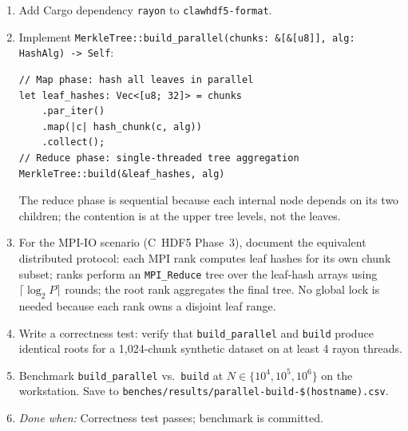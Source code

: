 \documentclass[11pt]{article}
\begin{document}
\begin{enumerate}[nosep]
  \item Add Cargo dependency \texttt{rayon} to \texttt{clawhdf5-format}.
  \item Implement \texttt{MerkleTree::build\_parallel(chunks: \&[\&[u8]],
    alg: HashAlg) -> Self}:
\begin{lstlisting}
// Map phase: hash all leaves in parallel
let leaf_hashes: Vec<[u8; 32]> = chunks
    .par_iter()
    .map(|c| hash_chunk(c, alg))
    .collect();
// Reduce phase: single-threaded tree aggregation
MerkleTree::build(&leaf_hashes, alg)
\end{lstlisting}
    The reduce phase is sequential because each internal node depends on
    its two children; the contention is at the upper tree levels, not the
    leaves.
  \item For the MPI-IO scenario (C~HDF5 Phase~3), document the equivalent
    distributed protocol: each MPI rank computes leaf hashes for its own
    chunk subset; ranks perform an \texttt{MPI\_Reduce} tree over the
    leaf-hash arrays using $\lceil\log_2 P\rceil$ rounds; the root rank
    aggregates the final tree. No global lock is needed because each rank
    owns a disjoint leaf range.
  \item Write a correctness test: verify that
    \texttt{build\_parallel} and \texttt{build} produce identical roots
    for a 1,024-chunk synthetic dataset on at least 4 rayon threads.
  \item Benchmark \texttt{build\_parallel} vs.\ \texttt{build} at
    $N \in \{10^4, 10^5, 10^6\}$ on the workstation. Save to
    \texttt{benches/results/parallel-build-\$(hostname).csv}.
  \item \emph{Done when:} Correctness test passes; benchmark is committed.
\end{enumerate}

\end{document}

